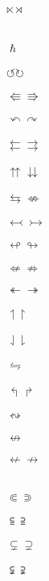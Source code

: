 \documentclass{article}
\begin{document}
$\ltimes \rtimes $\\\\
\\
$\hslash$\\\\
$\circlearrowleft \circlearrowright$\\\\
$\Lleftarrow \Rrightarrow$\\\\
$\curvearrowleft \curvearrowright$\\\\
$\leftleftarrows \rightrightarrows$\\\\
$\upuparrows \downdownarrows$\\\\
$\leftrightarrows \nLeftrightarrow$\\\\
$\leftarrowtail \rightarrowtail$\\\\
$\looparrowleft \looparrowright$\\\\
$\nLeftarrow \nRightarrow$\\\\
$\twoheadleftarrow \twoheadrightarrow$\\\\
$\upharpoonleft \upharpoonright$\\\\
$\downharpoonleft \downharpoonright$\\\\
$\leftrightharpoons$\\\\
$\Lsh \Rsh$\\\\
$\leftrightsquigarrow$\\\\
$\nleftrightarrow$\\\\
$\nleftarrow \nrightarrow$\\\\
\\
$\Subset \Supset$\\\\
$\subseteqq \supseteqq$\\\\
$\subsetneq \supsetneq$\\\\
$\subsetneqq \supsetneqq$\\\\
\end{document}
